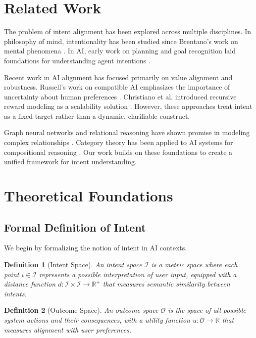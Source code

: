 \documentclass[12pt]{article}
\newtheorem{definition}{Definition}
\begin{document}
\section{Related Work}

The problem of intent alignment has been explored across multiple disciplines. In philosophy of mind, intentionality has been studied since Brentano's work on mental phenomena \cite{brentano1874}. In AI, early work on planning and goal recognition laid foundations for understanding agent intentions \cite{cohen1990}.

Recent work in AI alignment has focused primarily on value alignment and robustness. Russell's work on compatible AI emphasizes the importance of uncertainty about human preferences \cite{russell2019}. Christiano et al. introduced recursive reward modeling as a scalability solution \cite{christiano2017}. However, these approaches treat intent as a fixed target rather than a dynamic, clarifiable construct.

Graph neural networks and relational reasoning have shown promise in modeling complex relationships \cite{battaglia2018}. Category theory has been applied to AI systems for compositional reasoning \cite{fong2019}. Our work builds on these foundations to create a unified framework for intent understanding.

\section{Theoretical Foundations}

\subsection{Formal Definition of Intent}

We begin by formalizing the notion of intent in AI contexts.

\begin{definition}[Intent Space]
An intent space $\mathcal{I}$ is a metric space where each point $i \in \mathcal{I}$ represents a possible interpretation of user input, equipped with a distance function $d: \mathcal{I} \times \mathcal{I} \rightarrow \mathbb{R}^+$ that measures semantic similarity between intents.
\end{definition}

\begin{definition}[Outcome Space]
An outcome space $\mathcal{O}$ is the space of all possible system actions and their consequences, with a utility function $u: \mathcal{O} \rightarrow \mathbb{R}$ that measures alignment with user preferences.
\end{definition}
\end{document}
